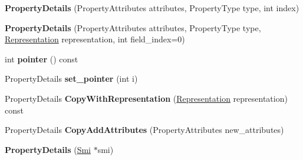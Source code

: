 \begin{DoxyCompactItemize}
\item 
\hypertarget{classv8_1_1internal_1_1_b_a_s_e___e_m_b_e_d_d_e_d_a5d2c599943ed0aaee04e2c9c50d77e0e}{}{\bfseries Property\+Details} (Property\+Attributes attributes, Property\+Type type, int index)\label{classv8_1_1internal_1_1_b_a_s_e___e_m_b_e_d_d_e_d_a5d2c599943ed0aaee04e2c9c50d77e0e}

\item 
\hypertarget{classv8_1_1internal_1_1_b_a_s_e___e_m_b_e_d_d_e_d_a8583b4f8d5ab92f0a08dc3f83997a9de}{}{\bfseries Property\+Details} (Property\+Attributes attributes, Property\+Type type, \hyperlink{classv8_1_1internal_1_1_representation}{Representation} representation, int field\+\_\+index=0)\label{classv8_1_1internal_1_1_b_a_s_e___e_m_b_e_d_d_e_d_a8583b4f8d5ab92f0a08dc3f83997a9de}

\item 
\hypertarget{classv8_1_1internal_1_1_b_a_s_e___e_m_b_e_d_d_e_d_a7651ca4c784735d915442262f761173d}{}int {\bfseries pointer} () const \label{classv8_1_1internal_1_1_b_a_s_e___e_m_b_e_d_d_e_d_a7651ca4c784735d915442262f761173d}

\item 
\hypertarget{classv8_1_1internal_1_1_b_a_s_e___e_m_b_e_d_d_e_d_a9a2b046dbb61564637974d907a92b8b5}{}Property\+Details {\bfseries set\+\_\+pointer} (int i)\label{classv8_1_1internal_1_1_b_a_s_e___e_m_b_e_d_d_e_d_a9a2b046dbb61564637974d907a92b8b5}

\item 
\hypertarget{classv8_1_1internal_1_1_b_a_s_e___e_m_b_e_d_d_e_d_a53a40a9515a5874125f9bd32081a8b8d}{}Property\+Details {\bfseries Copy\+With\+Representation} (\hyperlink{classv8_1_1internal_1_1_representation}{Representation} representation) const \label{classv8_1_1internal_1_1_b_a_s_e___e_m_b_e_d_d_e_d_a53a40a9515a5874125f9bd32081a8b8d}

\item 
\hypertarget{classv8_1_1internal_1_1_b_a_s_e___e_m_b_e_d_d_e_d_a085c88b3c1e59400c44cffac0c51cb9c}{}Property\+Details {\bfseries Copy\+Add\+Attributes} (Property\+Attributes new\+\_\+attributes)\label{classv8_1_1internal_1_1_b_a_s_e___e_m_b_e_d_d_e_d_a085c88b3c1e59400c44cffac0c51cb9c}

\item 
\hypertarget{classv8_1_1internal_1_1_b_a_s_e___e_m_b_e_d_d_e_d_a039542175d1798e12d5c9c7e899f4b6e}{}{\bfseries Property\+Details} (\hyperlink{classv8_1_1internal_1_1_smi}{Smi} $\ast$smi)\label{classv8_1_1internal_1_1_b_a_s_e___e_m_b_e_d_d_e_d_a039542175d1798e12d5c9c7e899f4b6e}


\end{DoxyCompactItemize}
